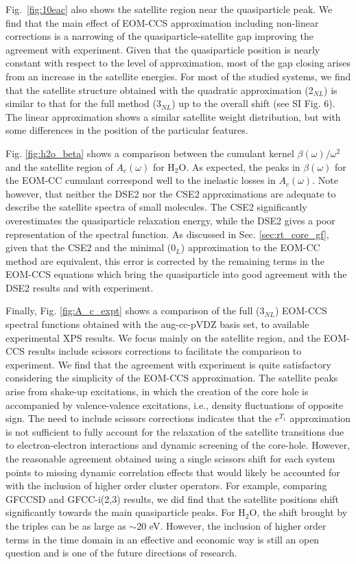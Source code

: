 \documentclass[aps,prb,twocolumn,groupaddress,floatfix]{revtex4}
\begin{document}
Fig.\ \ref{fig:10eac} also shows the satellite region near the quasiparticle
peak. We find that the main effect of EOM-CCS approximation including non-linear
corrections is a narrowing of the quasiparticle-satellite gap improving the
agreement with experiment. Given that the quasiparticle position is nearly
constant with respect to the level of approximation, most of the gap closing
arises from an increase in the satellite energies. For most of the studied
systems, we find that the satellite structure obtained with the quadratic
approximation (2$_{NL}$) is similar to that for the full method (3$_{NL}$) up to
the overall shift (see SI Fig. 6). The linear approximation shows a similar
satellite weight distribution, but with some differences in the position of the
particular features.

Fig. \ref{fig:h2o_beta} shows a comparison between the cumulant kernel
$\beta(\omega)/\omega^2$ and the satellite region of $A_c(\omega)$ for H$_2$O.
As expected, the peaks in $\beta(\omega)$ for the EOM-CC cumulant
correspond well to the inelastic losses in $A_c(\omega)$.
Note however, that neither the DSE2 nor the CSE2 approximations are adequate to
describe the satellite spectra of small molecules.  The CSE2 significantly
overestimates the quasiparticle relaxation energy, while the DSE2 gives a
poor representation of the spectral function.
As discussed in Sec. \ref{sec:rt_core_gf}, given that the CSE2 and the
minimal (0$_L$) approximation to the EOM-CC method
are equivalent, this error 
is corrected by the remaining terms in the EOM-CCS equations which bring
the quasiparticle into good agreement with the DSE2 results and with experiment.

Finally, Fig. \ref{fig:A_c_expt} shows a comparison of the full (3$_{NL}$)
EOM-CCS spectral functions obtained with the aug-cc-pVDZ basis set, to available
experimental XPS results. We focus mainly on the satellite region, and the
EOM-CCS results include scissors corrections to facilitate the comparison to
experiment. We find that the agreement with experiment is quite satisfactory
considering the simplicity of the EOM-CCS approximation. The satellite peaks
arise from shake-up excitations, in which the creation of the core hole is
accompanied by valence-valence excitations, i.e., density fluctuations of
opposite sign.  The need to include scissors corrections indicates that the
$e^{T_1}$ approximation is not sufficient to fully account for the  relaxation
of the satellite transitions due to electron-electron interactions and dynamic
screening of the core-hole. However, the reasonable agreement obtained using a
single scissors shift for each system points to missing dynamic correlation
effects that would likely be accounted for with the inclusion of higher order
cluster operators. For example, comparing GFCCSD and GFCC-i(2,3) results, we did
find that the satellite positions shift significantly towards the main
quasiparticle peaks. For H$_2$O, the shift brought by the triples can be as
large as $\sim$20 eV. However, the inclusion of higher order terms in the time
domain in an effective and economic way is still an open question and is one of
the future directions of research. 
\end{document}
